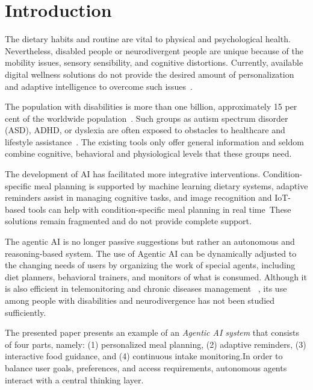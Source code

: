 \documentclass[pdflatex,sn-mathphys-num]{sn-jnl}
\begin{document}
	\section{Introduction}\label{sec:intro}
	
	The dietary habits and routine are vital to physical and psychological health. Nevertheless, disabled people or neurodivergent people are unique because of the mobility issues, sensory sensibility, and cognitive distortions. Currently, available digital wellness solutions do not provide the desired amount of personalization and adaptive intelligence to overcome such issues~\cite{WHO2020,UNICEF2021}.
	
	The population with disabilities is more than one billion, approximately 15 per cent of the worldwide population~\cite{WHO2020}. Such groups as autism spectrum disorder (ASD), ADHD, or dyslexia are often exposed to obstacles to healthcare and lifestyle assistance~\cite{Kapp2020,SonugaBarke2021}. The existing tools only offer general information and seldom combine cognitive, behavioral and physiological levels that these groups need.
	
	The development of AI has facilitated more integrative interventions. Condition-specific meal planning is supported by machine learning dietary systems, adaptive reminders assist in managing cognitive tasks, and image recognition and IoT-based tools can help with condition-specific meal planning in real time~\cite{Elsweiler2017,Alferi2020,Chu2019,Mertes2021,Kong2022}These solutions remain fragmented and do not provide complete support.
	
	The agentic AI is no longer passive suggestions but rather an autonomous and reasoning-based system. The use of Agentic AI can be dynamically adjusted to the changing needs of users by organizing the work of special agents, including diet planners, behavioral trainers, and monitors of what is consumed. Although it is also efficient in telemonitoring and chronic diseases management ~\cite{Lemke2022,Choudhury2023}, its use among people with disabilities and neurodivergence has not been studied sufficiently.
	
	The presented paper presents an example of an \textit{Agentic AI system} that consists of four parts, namely: (1) personalized meal planning, (2) adaptive reminders, (3) interactive food guidance, and (4) continuous intake monitoring.In order to balance user goals, preferences, and access requirements, autonomous agents interact with a central thinking layer.
	
\end{document}

